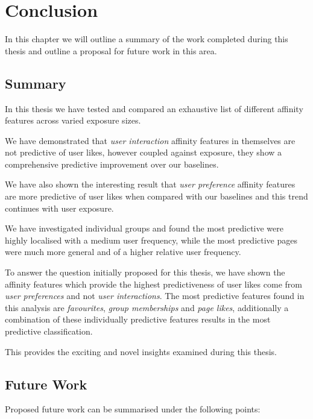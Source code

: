 
\chapter{Conclusion}
\label{cha:conc}

In this chapter we will outline a summary of the work completed during this thesis and outline a proposal for future work in this area.

\section{Summary}
\label{sec:conc}

In this thesis we have tested and compared an exhaustive list of different affinity features across varied exposure sizes.

We have demonstrated that \emph{user interaction} affinity features in themselves are not predictive of user likes, however coupled against 
exposure, they show a comprehensive predictive improvement over our baselines.

We have also shown the interesting result that \emph{user preference} affinity features are more predictive of user likes when compared
with our baselines and this trend continues with user exposure.

We have investigated individual groups and found the most predictive were highly localised with a medium
user frequency, while the most predictive pages were much more general and of a higher relative user frequency.

To answer the question initially proposed for this thesis, we have shown the affinity features which provide the highest predictiveness of user likes come from \emph{user preferences} and not
\emph{user interactions}. The most predictive features found in this analysis are \emph{favourites}, \emph{group memberships} 
and \emph{page likes}, additionally a combination of these individually predictive features results in the most predictive classification.

This provides the exciting and novel insights examined during this thesis.

\section{Future Work}
\label{sec:ftw}

Proposed future work can be summarised under the following points:

